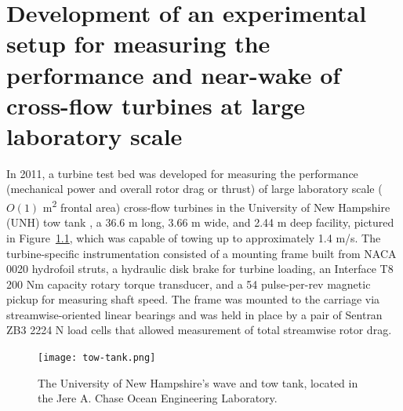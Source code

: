 \chapter{Development of an experimental setup for measuring the performance and
    near-wake of cross-flow turbines at large laboratory
    scale}\label{chap:exp-setup}

In 2011, a turbine test bed was developed for measuring the performance
(mechanical power and overall rotor drag or thrust) of large laboratory scale
($O(1)$ m\textsuperscript{2} frontal area) cross-flow turbines in the University
of New Hampshire (UNH) tow tank \cite{Bachant2011-MS}, a 36.6 m long, 3.66 m
wide, and 2.44 m deep facility, pictured in Figure~\ref{fig:tow-tank}, which was
capable of towing up to approximately 1.4 m/s. The turbine-specific
instrumentation consisted of a mounting frame built from NACA 0020 hydrofoil
struts, a hydraulic disk brake for turbine loading, an Interface T8 200 Nm
capacity rotary torque transducer, and a 54 pulse-per-rev magnetic pickup for
measuring shaft speed. The frame was mounted to the carriage via
streamwise-oriented linear bearings and was held in place by a pair of Sentran
ZB3 2224 N load cells that allowed measurement of total streamwise rotor drag.

\begin{figure}
    \centering

    \texttt{[image: tow-tank.png]}

    \caption{The University of New Hampshire's wave and tow tank, located in the
        Jere A. Chase Ocean Engineering Laboratory.}

    \label{fig:tow-tank}
\end{figure}

